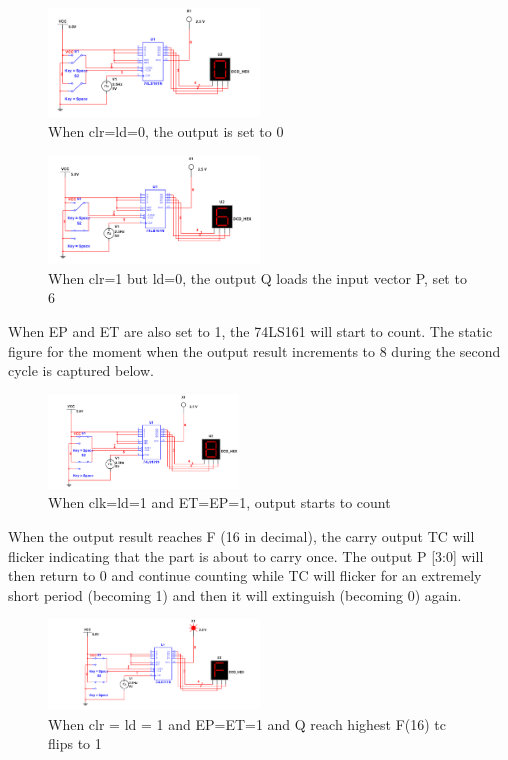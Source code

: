 \documentclass[conference]{IEEEtran}
\begin{document}
\begin{figure}[h]
    \centering
    \includegraphics[width=0.5\textwidth]{multisim_clr_ld_0}
    \caption{When clr=ld=0, the output is set to 0}
\end{figure}

\begin{figure}[h]
    \centering
    \includegraphics[width=0.5\textwidth]{multisim_clr_1_ld_0}
    \caption{When clr=1 but ld=0, the output Q loads the input vector P, set to 6}
\end{figure}

When EP and ET are also set to 1, the 74LS161 will start to count. The static figure for the moment when the output result increments to 8 during the second cycle is captured below.

\begin{figure}[h]
    \centering
    \includegraphics[width=0.45\textwidth,height=0.175\textheight]{multisim_count_8}
    \caption{When clk=ld=1 and ET=EP=1, output starts to count}
\end{figure}

When the output result reaches F (16 in decimal), the carry output TC will flicker indicating that the part is about to carry once. The output P [3:0] will then return to 0 and continue counting while TC will flicker for an extremely short period (becoming 1) and then it will extinguish (becoming 0) again.

\begin{figure}[h]
    \centering
    \includegraphics[width=0.5\textwidth]{multisim_count_f}
    \caption{When clr = ld = 1 and EP=ET=1 and Q reach highest F(16) tc flips to 1}
\end{figure}
\end{document}
